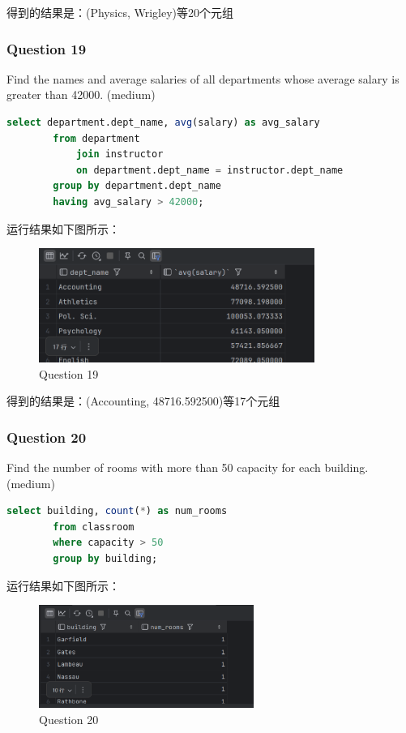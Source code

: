 \documentclass{article}
\begin{document}
    得到的结果是：(Physics, Wrigley)等20个元组
    
    \subsubsection{Question 19}
    
    Find the names and average salaries of all departments whose average salary is greater than 42000. (medium)
    
    \begin{lstlisting}[language=sql, title=Question 19, tabsize=4]
    	select department.dept_name, avg(salary) as avg_salary
    	from department
    		join instructor
    		on department.dept_name = instructor.dept_name
    	group by department.dept_name
    	having avg_salary > 42000;
    \end{lstlisting}
    
    运行结果如下图所示：
    
    \begin{figure}[H]
    	\centering
    	\includegraphics[width=9cm]{./images/23.Question19.png}
    	\caption{Question 19}
    \end{figure}
    
    得到的结果是：(Accounting, 48716.592500)等17个元组
    
    \subsubsection{Question 20}
    
    Find the number of rooms with more than 50 capacity for each building. (medium)
    
    \begin{lstlisting}[language=sql, title=Question 20, tabsize=4]
    	select building, count(*) as num_rooms
    	from classroom
    	where capacity > 50
    	group by building;
    \end{lstlisting}
    
    运行结果如下图所示：
    
    \begin{figure}[H]
    	\centering
    	\includegraphics[width=7cm]{./images/24.Question20.png}
    	\caption{Question 20}
    \end{figure}
    
\end{document}
